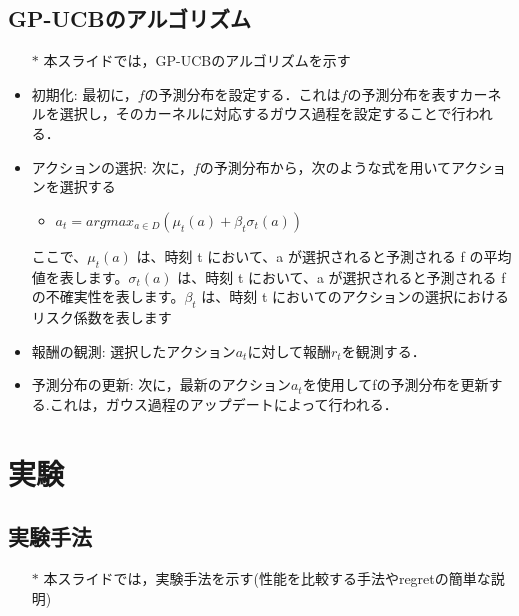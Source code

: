 \documentclass[dvipdfmx, 10.5pt]{beamer}
\begin{document}
\subsection{GP-UCBのアルゴリズム}
\begin{frame}{\insertsubsection}
	\begin{itemize}
		\item[$\ast$] 本スライドでは，GP-UCBのアルゴリズムを示す
		\item 初期化: 最初に，$f$の予測分布を設定する．これは$f$の予測分布を表すカーネルを選択し，そのカーネルに対応するガウス過程を設定することで行われる．
		\item アクションの選択: 次に，$f$の予測分布から，次のような式を用いてアクションを選択する
		\begin{itemize}
			\item $a_t = argmax_{a \in D} (\mu_t(a) + \beta_t \sigma_t(a))$
		\end{itemize}
		ここで、$\mu_t(a)$ は、時刻 t において、a が選択されると予測される f の平均値を表します。$\sigma_t(a)$ は、時刻 t において、a が選択されると予測される f の不確実性を表します。$\beta_t$ は、時刻 t においてのアクションの選択におけるリスク係数を表します
		\item 報酬の観測: 選択したアクション$a_t$に対して報酬$r_t$を観測する．
		\item 予測分布の更新: 次に，最新のアクション$a_t$を使用してfの予測分布を更新する.これは，ガウス過程のアップデートによって行われる．
	\end{itemize}

\end{frame}


\section{実験}



\subsection{実験手法}
\begin{frame}{\insertsubsection}
	\begin{itemize}
		\item[$\ast$] 本スライドでは，実験手法を示す(性能を比較する手法やregretの簡単な説明)
	\end{itemize}
\end{frame}
\end{document}
